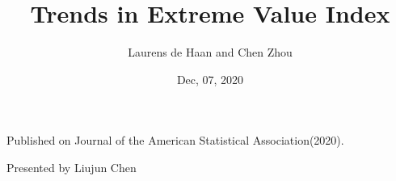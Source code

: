 \documentclass{beamer}
\author{Laurens de Haan and Chen Zhou }
\date{Dec, 07, 2020}
\title{Trends in Extreme Value Index}
\begin{document}
\begin{frame}
\titlepage
\begin{center}
    Published on Journal of the American Statistical Association(2020).

    \bigskip
    Presented by Liujun Chen

\end{center}
\end{frame}
\end{document}
